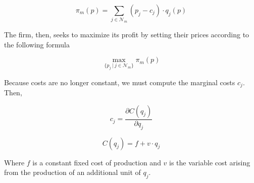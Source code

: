 \documentclass{tfg}
\begin{document}
\begin{equation*}
\pi_m(p) = \sum_{j \in \mathcal{N}_m} (p_j - c_j)\cdot q_j(p)
\end{equation*}

The firm, then, seeks to maximize its profit by setting their prices according to the following formula

\begin{equation*}
\max_{\{p_j ~ | ~ j \in \mathcal{N}_m\}} \pi_m(p)
\end{equation*}

Because costs are no longer constant, we must compute the marginal costs $c_j$. Then,

\begin{equation*}
c_j = \frac{\partial C(q_j)}{\partial q_j}
\end{equation*}

\begin{equation*}
C(q_j) = f + v \cdot q_j
\end{equation*}

Where $f$ is a constant fixed cost of production and $v$ is the variable cost arising from the production of an additional unit of $q_j$. 

%



%
%
%

%
%
%


\end{document}
